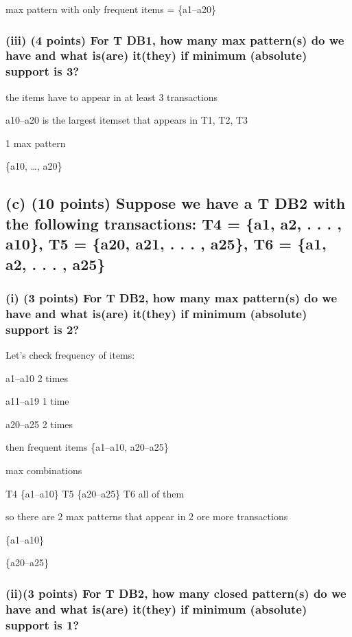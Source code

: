 \documentclass[
]{article}
\begin{document}
max pattern with only frequent items = \{a1--a20\}

\subsubsection{(iii) (4 points) For T DB1, how many max pattern(s) do we
have and what is(are) it(they) if minimum (absolute) support is
3?}\label{iii-4-points-for-t-db1-how-many-max-patterns-do-we-have-and-what-isare-itthey-if-minimum-absolute-support-is-3}

the items have to appear in at least 3 transactions

a10--a20 is the largest itemset that appears in T1, T2, T3

1 max pattern

\{a10, \ldots, a20\}

\subsection{(c) (10 points) Suppose we have a T DB2 with the following
transactions: T4 = \{a1, a2, . . . , a10\}, T5 = \{a20, a21, . . . ,
a25\}, T6 = \{a1, a2, . . . ,
a25\}}\label{c-10-points-suppose-we-have-a-t-db2-with-the-following-transactions-t4-a1-a2-.-.-.-a10-t5-a20-a21-.-.-.-a25-t6-a1-a2-.-.-.-a25}

\subsubsection{(i) (3 points) For T DB2, how many max pattern(s) do we
have and what is(are) it(they) if minimum (absolute) support is
2?}\label{i-3-points-for-t-db2-how-many-max-patterns-do-we-have-and-what-isare-itthey-if-minimum-absolute-support-is-2}

Let's check frequency of items:

a1--a10 2 times

a11--a19 1 time

a20--a25 2 times

then frequent items \{a1--a10, a20--a25\}

max combinations

T4 \{a1--a10\} T5 \{a20--a25\} T6 all of them

so there are 2 max patterns that appear in 2 ore more transactions

\{a1--a10\}

\{a20--a25\}

\subsubsection{(ii)(3 points) For T DB2, how many closed pattern(s) do
we have and what is(are) it(they) if minimum (absolute) support is
1?}\label{ii3-points-for-t-db2-how-many-closed-patterns-do-we-have-and-what-isare-itthey-if-minimum-absolute-support-is-1}
\end{document}
